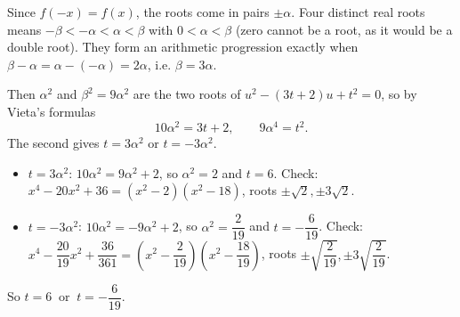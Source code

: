 Since $f(-x)=f(x)$, the roots come in pairs $\pm\alpha$. Four distinct real roots means $-\beta<-\alpha<\alpha<\beta$ with $0<\alpha<\beta$ (zero cannot be a root, as it would be a double root). They form an arithmetic progression exactly when $\beta-\alpha=\alpha-(-\alpha)=2\alpha$, i.e. $\beta=3\alpha$.

Then $\alpha^2$ and $\beta^2=9\alpha^2$ are the two roots of $u^2-(3t+2)u+t^2=0$, so by Vieta's formulas
\[10\alpha^2=3t+2,\qquad9\alpha^4=t^2.\]
The second gives $t=3\alpha^2$ or $t=-3\alpha^2$.
\begin{itemize}
\item $t=3\alpha^2$: $10\alpha^2=9\alpha^2+2$, so $\alpha^2=2$ and $t=6$. Check: $x^4-20x^2+36=\left(x^2-2\right)\left(x^2-18\right)$, roots $\pm\sqrt2,\pm3\sqrt2$.
\item $t=-3\alpha^2$: $10\alpha^2=-9\alpha^2+2$, so $\alpha^2=\dfrac{2}{19}$ and $t=-\dfrac{6}{19}$. Check: $x^4-\dfrac{20}{19}x^2+\dfrac{36}{361}=\left(x^2-\dfrac2{19}\right)\left(x^2-\dfrac{18}{19}\right)$, roots $\pm\sqrt{\dfrac2{19}},\pm3\sqrt{\dfrac2{19}}$.
\end{itemize}
So $\boxed{t=6\ \text{ or }\ t=-\dfrac{6}{19}}$.
